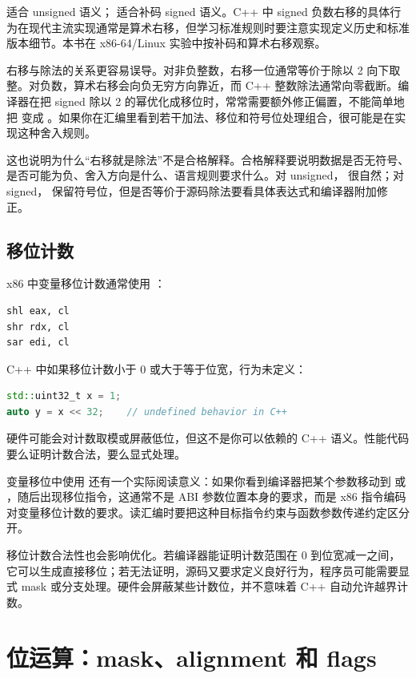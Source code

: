  适合 unsigned 语义； 适合补码 signed 语义。C++ 中 signed 负数右移的具体行为在现代主流实现通常是算术右移，但学习标准规则时要注意实现定义历史和标准版本细节。本书在 x86-64/Linux 实验中按补码和算术右移观察。

右移与除法的关系更容易误导。对非负整数，右移一位通常等价于除以 2 向下取整。对负数，算术右移会向负无穷方向靠近，而 C++ 整数除法通常向零截断。编译器在把 signed 除以 2 的幂优化成移位时，常常需要额外修正偏置，不能简单地把  变成 。如果你在汇编里看到若干加法、移位和符号位处理组合，很可能是在实现这种舍入规则。

这也说明为什么“右移就是除法”不是合格解释。合格解释要说明数据是否无符号、是否可能为负、舍入方向是什么、语言规则要求什么。对 unsigned， 很自然；对 signed， 保留符号位，但是否等价于源码除法要看具体表达式和编译器附加修正。

\subsection{移位计数}

x86 中变量移位计数通常使用 ：

\begin{lstlisting}
shl eax, cl
shr rdx, cl
sar edi, cl
\end{lstlisting}

C++ 中如果移位计数小于 0 或大于等于位宽，行为未定义：

\begin{lstlisting}[language=C++]
std::uint32_t x = 1;
auto y = x << 32;    // undefined behavior in C++
\end{lstlisting}

硬件可能会对计数取模或屏蔽低位，但这不是你可以依赖的 C++ 语义。性能代码要么证明计数合法，要么显式处理。

变量移位中使用  还有一个实际阅读意义：如果你看到编译器把某个参数移动到  或 ，随后出现移位指令，这通常不是 ABI 参数位置本身的要求，而是 x86 指令编码对变量移位计数的要求。读汇编时要把这种目标指令约束与函数参数传递约定区分开。

移位计数合法性也会影响优化。若编译器能证明计数范围在 0 到位宽减一之间，它可以生成直接移位；若无法证明，源码又要求定义良好行为，程序员可能需要显式 mask 或分支处理。硬件会屏蔽某些计数位，并不意味着 C++ 自动允许越界计数。

\section{位运算：mask、alignment 和 flags}

